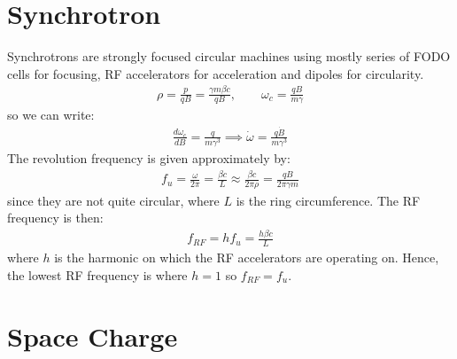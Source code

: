 \documentclass{article}
\numberwithin{equation}{section}
\begin{document}
\section{Synchrotron}
Synchrotrons are strongly focused circular machines using mostly series of FODO cells for focusing, RF accelerators for acceleration and dipoles for circularity. 
\begin{align}
\rho = \frac{p}{qB} = \frac{\gamma m \beta c}{qB},\qquad \omega_c = \frac{qB}{m\gamma}
\end{align}
so we can write:
\begin{align}
\frac{d \omega_c}{dB} = \frac{q}{m \gamma^3} \implies \dot{\omega} = \frac{q \dot{B}}{m \gamma^3}
\end{align}
The revolution frequency is given approximately by:
\begin{align}
f_u = \frac{\omega}{2 \pi} = \frac{\beta c}{L} \approx \frac{\beta c}{2 \pi \rho} = \frac{qB}{2\pi \gamma m}
\end{align}
since they are not quite circular, where $L$ is the ring circumference. The RF frequency is then:
\begin{align}
f_{RF} = h f_u = \frac{h \beta c}{L}
\end{align}
where $h$ is the harmonic on which the RF accelerators are operating on. Hence, the lowest RF frequency is where $h=1$ so $f_{RF} = f_u$.


\section{Space Charge}
\end{document}
